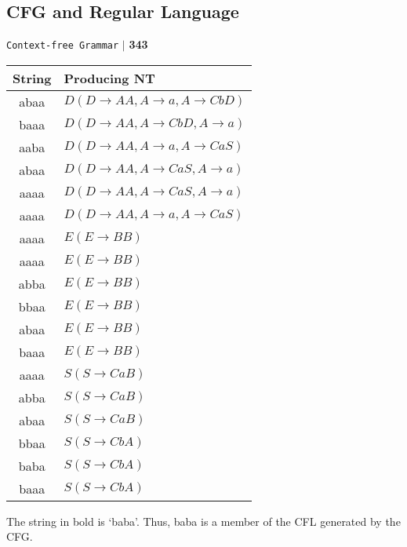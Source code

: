 \documentclass[a4,9pt]{beamer}
\begin{document}
\begin{frame}
\section*{CFG and Regular Language}
\begin{flushright}
\texttt{Context-free Grammar} \hspace*{0.1cm}\textbf{$|$} \hspace*{0.1cm} \textbf{343}\hspace*{0.1cm}
\end{flushright}
\vspace*{0.1cm}

\tiny{
\begin{center}
\begin{tabular}{cl}
\hline

\hline

\hline

\hline
String & Producing NT \\
\hline
abaa & $D (D \rightarrow AA, A \rightarrow a, A \rightarrow CbD)$ \\
baaa & $D (D \rightarrow AA, A \rightarrow CbD, A \rightarrow a)$ \\
aaba & $D (D \rightarrow AA, A \rightarrow a, A \rightarrow CaS)$ \\
abaa & $D (D \rightarrow AA, A \rightarrow CaS, A \rightarrow a)$ \\
aaaa & $D (D \rightarrow AA, A \rightarrow CaS, A \rightarrow a)$ \\
aaaa & $D (D \rightarrow AA, A \rightarrow a, A \rightarrow CaS)$ \\
aaaa & $E (E \rightarrow BB)$ \\
aaaa & $E (E \rightarrow BB)$ \\
abba & $E (E \rightarrow BB)$ \\
bbaa & $E (E \rightarrow BB)$ \\
abaa & $E (E \rightarrow BB)$ \\
baaa & $E (E \rightarrow BB)$ \\
aaaa & $S (S \rightarrow CaB)$ \\
abba & $S (S \rightarrow CaB)$ \\
abaa & $S (S \rightarrow CaB)$ \\
bbaa & $S (S \rightarrow CbA)$ \\
baba & $S (S \rightarrow CbA)$ \\
baaa & $S (S \rightarrow CbA)$ \\
\hline

\hline

\hline

\hline

\end{tabular}
\end{center}
}

\vspace*{0.2cm}
\hspace*{0.5cm} The string in bold is ‘baba’. Thus, baba is a member of the CFL generated by the CFG.\\

\vspace*{0.1cm}
\end{frame}
\end{document}
